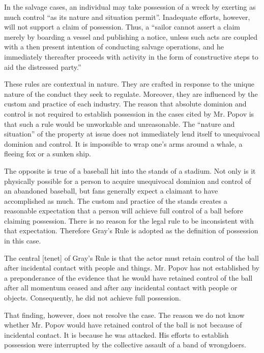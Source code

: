 In the salvage cases, an individual may take possession of a wreck by exerting
as much control ``as its nature and situation permit''. Inadequate efforts,
however, will not support a claim of possession. Thus, a ``sailor cannot assert
a claim merely by boarding a vessel and publishing a notice, unless such acts
are coupled with a then present intention of conducting salvage operations, and
he immediately thereafter proceeds with activity in the form of constructive
steps to aid the distressed party.''

These rules are contextual in nature. They are crafted in response to the unique
nature of the conduct they seek to regulate. Moreover, they are influenced by
the custom and practice of each industry. The reason that absolute dominion and
control is not required to establish possession in the cases cited by Mr. Popov
is that such a rule would be unworkable and unreasonable. The ``nature and
situation'' of the property at issue does not immediately lend itself to
unequivocal dominion and control. It is impossible to wrap one's arms around a
whale, a fleeing fox or a sunken ship.

The opposite is true of a baseball hit into the stands of a stadium. Not only is
it physically possible for a person to acquire unequivocal dominion and control
of an abandoned baseball, but fans generally expect a claimant to have
accomplished as much. The custom and practice of the stands creates a reasonable
expectation that a person will achieve full control of a ball before claiming
possession. There is no reason for the legal rule to be inconsistent with that
expectation. Therefore Gray's Rule is adopted as the definition of possession in
this case.

The central [tenet] of Gray's Rule is that the actor must retain control of the
ball after incidental contact with people and things. Mr. Popov has not
established by a preponderance of the evidence that he would have retained
control of the ball after all momentum ceased and after any incidental contact
with people or objects. Consequently, he did not achieve full possession.

That finding, however, does not resolve the case. The reason we do not know
whether Mr. Popov would have retained control of the ball is not because of
incidental contact. It is because he was attacked. His efforts to establish
possession were interrupted by the collective assault of a band of
wrongdoers.

